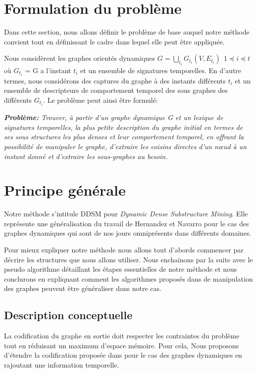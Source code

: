 \documentclass[a4paper,oneside,12pt]{report}
\theoremstyle{definition}
\begin{document}
		\section{Formulation du problème}
		Dans cette section, nous allons définir le problème de base auquel notre méthode convient tout en définissant le cadre dans lequel elle peut être appliquée. 
		
		Nous considèrent les graphes orientés dynamiques $\displaystyle{G=\bigcup_{t_{i}}G_{t_{i}}(V,E_{t_{i}})}\ \ 1 \preceq i \preceq t$ où $G_{t_{i}}$ = G a l'instant $t_{i}$ et un ensemble de signatures temporelles. En d'autre termes, nous considérons des captures du graphe à des instants différents $t_{i}$ et un ensemble de descripteurs de comportement temporel des sous graphes des différents $G_{t_{i}}$. Le problème peut ainsi être formulé:
		
			\textit{\textbf{Problème:}
		Trouver, à partir d'un graphe dynamique G et un lexique de signatures temporelles, la plus petite description du graphe initial en termes de ses sous structures les plus denses et leur comportement temporel, en offrant la possibilité de manipuler le graphe, d'extraire les voisins directes d'un nœud à un instant donné et d'extraire les sous-graphes au besoin. }

		\section{Principe générale}
			Notre méthode s'intitule DDSM pour \textit{Dynamic Dense Substructure Mining}. Elle représente une généralisation du travail de Hernandez et Navarro\citep{hernandez2014compressed} pour le cas des graphes dynamiques qui sont de nos jours omniprésents dans différents domaines.
			
			Pour mieux expliquer notre méthode nous allons tout d'abords commencer par décrire les structures que nous allons utiliser. Nous enchainons par la suite  avec le pseudo algorithme détaillant les étapes essentielles de notre méthode et nous conclurons en expliquant comment les algorithmes proposés dans \citep{hernandez2014compressed} de manipulation des graphes peuvent être généraliser dans notre cas.
			\subsection{Description conceptuelle}
			
			La codification du graphe en sortie doit respecter les contraintes du problème tout en réduisant un maximum d'espace mémoire. Pour cela, Nous proposons d'étendre la codification proposée dans \citep{hernandez2014compressed} pour le cas des graphes dynamiques en rajoutant une information temporelle. 
			
\end{document}
